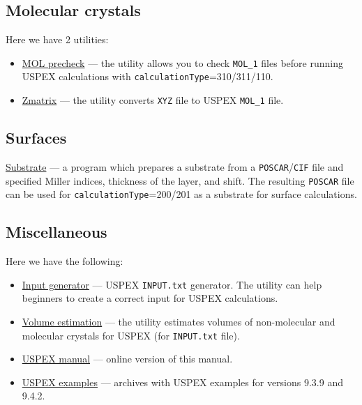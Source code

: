 \documentclass[12pt]{article}
\newcommand{\keyword}[1]{\texttt{#1}}
\newcommand{\file}[1]{\texttt{#1}}
\begin{document}
\subsection{Molecular crystals}
Here we have 2 utilities:
\begin{itemize}

\item \textcolor{blue}{\href{http://han.ess.sunysb.edu/MOL_precheck}{MOL precheck}}
--- the utility allows you to check \file{MOL\_1} files before running USPEX
calculations with \keyword{calculationType}=310/311/110.

\item \textcolor{blue}{\href{http://han.ess.sunysb.edu/zmatrix}{Zmatrix}}
--- the utility converts \file{XYZ} file to USPEX \file{MOL\_1} file.

\end{itemize}

\subsection{Surfaces}
\textcolor{blue}{\href{http://han.ess.sunysb.edu/substrate}{Substrate}} 
--- a program which prepares a substrate from a \file{POSCAR}/\file{CIF} file
and specified Miller indices, thickness of the layer, and shift. The resulting
\file{POSCAR} file can be used for \keyword{calculationType}=200/201 as a
substrate for surface calculations.


\subsection{Miscellaneous}
Here we have the following:
\begin{itemize}

\item \textcolor{blue}{\href{http://han.ess.sunysb.edu/input_generator}{Input generator}}
--- USPEX \file{INPUT.txt} generator. The utility can help beginners to create a
correct input for USPEX calculations.

\item \textcolor{blue}{\href{http://han.ess.sunysb.edu/volume_estimation}{Volume estimation}}
---  the utility estimates volumes of non-molecular and molecular crystals for
USPEX (for \file{INPUT.txt} file). 

\item \textcolor{blue}{\href{http://han.ess.sunysb.edu/uspex_manual}{USPEX manual}}
--- online version of this manual.

\item \textcolor{blue}{\href{http://han.ess.sunysb.edu/uspex_examples}{USPEX examples}}
--- archives with USPEX examples for versions 9.3.9 and 9.4.2.

\end{itemize}
\end{document}
